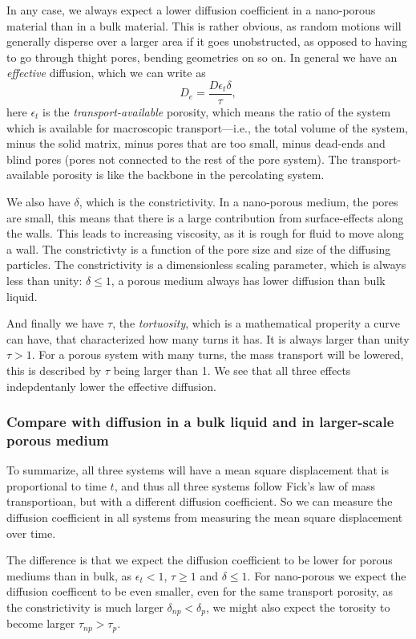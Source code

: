 \documentclass[a4paper, 11pt, notitlepage, english]{article}
\newcommand{\eps}{\epsilon}
\begin{document}
In any case, we always expect a lower diffusion coefficient in a nano-porous material than in a bulk material. This is rather obvious, as random motions will generally disperse over a larger area if it goes unobstructed, as opposed to having to go through thight pores, bending geometries on so on. In general we have an \emph{effective} diffusion, which we can write as
$$D_e = \frac{D \eps_t \delta}{\tau},$$
here $\eps_t$ is the \emph{transport-available} porosity, which means the ratio of the system which is available for macroscopic transport---i.e., the total volume of the system, minus the solid matrix, minus pores that are too small, minus dead-ends and blind pores (pores not connected to the rest of the pore system). The transport-available porosity is like the backbone in the percolating system. 

We also have $\delta$, which is the constrictivity. In a nano-porous medium, the pores are small, this means that there is a large contribution from surface-effects along the walls. This leads to increasing viscosity, as it is rough for fluid to move along a wall. The constrictivty is a function of the pore size and size of the diffusing particles. The constrictivity is a dimensionless scaling parameter, which is always less than unity: $\delta \leq 1$, a porous medium always has lower diffusion than bulk liquid.

And finally we have $\tau$, the \emph{tortuosity}, which is a mathematical properity a curve can have, that characterized how many turns it has. It is always larger than unity $\tau > 1$. For a porous system with many turns, the mass transport will be lowered, this is described by $\tau$ being larger than 1. We see that all three effects indepdentanly lower the effective diffusion.

\subsubsection*{Compare with diffusion in a bulk liquid and in larger-scale porous medium}

To summarize, all three systems will have a mean square displacement that is proportional to time $t$, and thus all three systems follow Fick's law of mass transportioan, but with a different diffusion coefficient. So we can measure the diffusion coefficient in all systems from measuring the mean square displacement over time.

The difference is that we expect the diffusion coefficient to be lower for porous mediums than in bulk, as $\eps_t < 1$, $\tau \geq 1$ and $\delta \leq 1$. For nano-porous we expect the diffusion coefficent to be even smaller, even for the same transport porosity, as the constrictivity is much larger $\delta_{np} < \delta_{p}$, we might also expect the torosity to become larger $\tau_{np} > \tau_{p}$.
\end{document}
